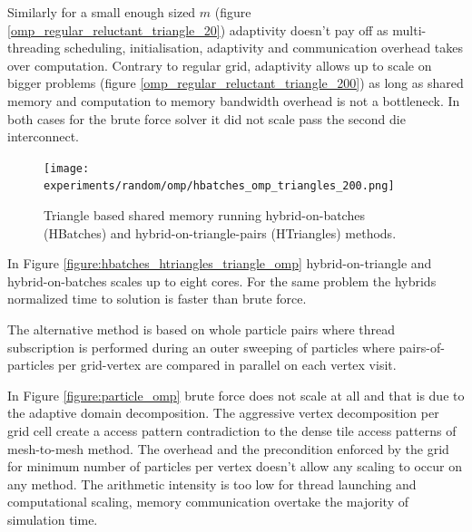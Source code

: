 Similarly for a small enough sized $m$ (figure \ref{omp_regular_reluctant_triangle_20}) adaptivity doesn't pay off as multi-threading scheduling, initialisation, adaptivity and communication overhead takes over computation. Contrary to regular grid, adaptivity allows up to scale on bigger problems (figure \ref{omp_regular_reluctant_triangle_200}) as long as shared memory and computation to memory bandwidth overhead is not a bottleneck. In both cases for the brute force solver it did not scale pass the second die interconnect.

\begin{figure}[htb]
  \begin{center}
    \texttt{[image: experiments/random/omp/hbatches\_omp\_triangles\_200.png]}
  \end{center}
  \caption{Triangle based shared memory running hybrid-on-batches (HBatches) and hybrid-on-triangle-pairs (HTriangles) methods.}
  \label{figure:hbatches_triangles_triangle_omp}
\end{figure}


In Figure \ref{figure:hbatches_htriangles_triangle_omp} hybrid-on-triangle and hybrid-on-batches scales up to eight cores. For the same problem the hybrids normalized time to solution is faster than brute force. 





The alternative method is based on whole particle pairs where thread subscription is performed during an outer sweeping of particles where pairs-of-particles per grid-vertex are compared in parallel on each vertex visit. 

In Figure \ref{figure:particle_omp} brute force does not scale at all and that is due to the adaptive domain decomposition. The aggressive vertex decomposition per grid cell create a access pattern contradiction to the dense tile access patterns of mesh-to-mesh method. The overhead and the precondition enforced by the grid for minimum number of particles per vertex doesn't allow any scaling to occur on any method. The arithmetic intensity is too low for thread launching and computational scaling, memory communication overtake the majority of simulation time. 

